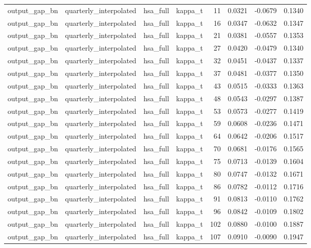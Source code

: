 \begin{tabular}{llllrrrr}
output\_gap\_bn & quarterly\_interpolated & hsa\_full & kappa\_t & 11 & 0.0321 & -0.0679 & 0.1340 \\
output\_gap\_bn & quarterly\_interpolated & hsa\_full & kappa\_t & 16 & 0.0347 & -0.0632 & 0.1347 \\
output\_gap\_bn & quarterly\_interpolated & hsa\_full & kappa\_t & 21 & 0.0381 & -0.0557 & 0.1353 \\
output\_gap\_bn & quarterly\_interpolated & hsa\_full & kappa\_t & 27 & 0.0420 & -0.0479 & 0.1340 \\
output\_gap\_bn & quarterly\_interpolated & hsa\_full & kappa\_t & 32 & 0.0451 & -0.0437 & 0.1337 \\
output\_gap\_bn & quarterly\_interpolated & hsa\_full & kappa\_t & 37 & 0.0481 & -0.0377 & 0.1350 \\
output\_gap\_bn & quarterly\_interpolated & hsa\_full & kappa\_t & 43 & 0.0515 & -0.0333 & 0.1363 \\
output\_gap\_bn & quarterly\_interpolated & hsa\_full & kappa\_t & 48 & 0.0543 & -0.0297 & 0.1387 \\
output\_gap\_bn & quarterly\_interpolated & hsa\_full & kappa\_t & 53 & 0.0573 & -0.0277 & 0.1419 \\
output\_gap\_bn & quarterly\_interpolated & hsa\_full & kappa\_t & 59 & 0.0608 & -0.0236 & 0.1471 \\
output\_gap\_bn & quarterly\_interpolated & hsa\_full & kappa\_t & 64 & 0.0642 & -0.0206 & 0.1517 \\
output\_gap\_bn & quarterly\_interpolated & hsa\_full & kappa\_t & 70 & 0.0681 & -0.0176 & 0.1565 \\
output\_gap\_bn & quarterly\_interpolated & hsa\_full & kappa\_t & 75 & 0.0713 & -0.0139 & 0.1604 \\
output\_gap\_bn & quarterly\_interpolated & hsa\_full & kappa\_t & 80 & 0.0747 & -0.0132 & 0.1671 \\
output\_gap\_bn & quarterly\_interpolated & hsa\_full & kappa\_t & 86 & 0.0782 & -0.0112 & 0.1716 \\
output\_gap\_bn & quarterly\_interpolated & hsa\_full & kappa\_t & 91 & 0.0813 & -0.0110 & 0.1762 \\
output\_gap\_bn & quarterly\_interpolated & hsa\_full & kappa\_t & 96 & 0.0842 & -0.0109 & 0.1802 \\
output\_gap\_bn & quarterly\_interpolated & hsa\_full & kappa\_t & 102 & 0.0880 & -0.0100 & 0.1887 \\
output\_gap\_bn & quarterly\_interpolated & hsa\_full & kappa\_t & 107 & 0.0910 & -0.0090 & 0.1947 \\

\end{tabular}
